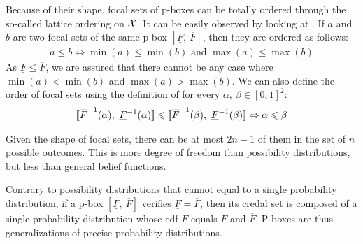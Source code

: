 Because of their shape, focal sets of p-boxes can be totally ordered through the so-called lattice ordering on $\mathcal{X}$. It can be easily observed by looking at . If $a$ and $b$ are two focal sets of the same p-box $[\underline{F}, ~\overline{F}]$, then they are ordered as follows:
\begin{align}
    a\leqslant b \Leftrightarrow \min(a)\leqslant\min(b) \text{ and } \max(a)\leqslant \max(b)
\end{align}
As $\underline{F}\leqslant\overline{F}$, we are assured that there cannot be any case where $\min(a)<\min(b)$ and $\max(a)> \max(b)$. We can also define the order of focal sets using the definition of  for every $\alpha,~\beta\in[0,1]^2$:
\begin{align*}
    [\![\overline{F}^{-1}(\alpha), ~\underline{F}^{-1}(\alpha)]\!] \leqslant [\![\overline{F}^{-1}(\beta), ~\underline{F}^{-1}(\beta)]\!] \Leftrightarrow \alpha\leqslant\beta
\end{align*}

Given the shape of focal sets, there can be at most $2n-1$ of them in the set of $n$ possible outcomes. This is more degree of freedom than possibility distributions, but less than general belief functions.
\begin{remark}
    Contrary to possibility distributions that cannot equal to a single probability distribution, if a p-box $[\underline{F}, ~\overline{F}]$ verifies $\underline{F}=\overline{F}$, then its credal set is composed of a single probability distribution whose \acrshort{cdf} $F$ equals $\underline{F}$ and $\overline{F}$. P-boxes are thus generalizations of precise probability distributions.
\end{remark}

